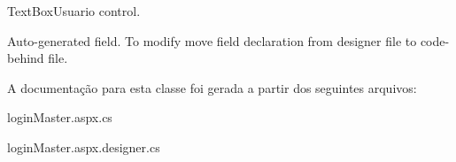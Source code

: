 TextBoxUsuario control. 

Auto-\/generated field. To modify move field declaration from designer file to code-\/behind file. 

A documentação para esta classe foi gerada a partir dos seguintes arquivos:\begin{DoxyCompactItemize}
\item 
loginMaster.aspx.cs\item 
loginMaster.aspx.designer.cs\end{DoxyCompactItemize}
